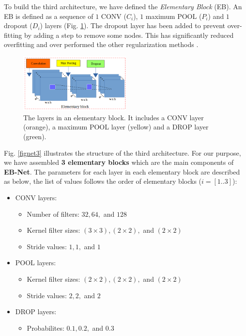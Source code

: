 \documentclass[review]{elsarticle}
\begin{document}
To build the third architecture, we have defined the
\textit{Elementary Block} (EB). An EB is defined as a sequence of $1$
CONV ($C_{i}$), $1$ maximum POOL ($P_i$) and $1$ dropout ($D_i$)
layers (Fig. \ref{figelementary}). The dropout layer has been added to
prevent over-fitting by adding a step to remove some nodes. This has
significantly reduced overfitting and over performed the other
regularization methods \cite{srivastava2014dropout}.


\begin{figure}[h]
	\centering
	\includegraphics[width=0.5\textwidth]{images/elementary_block}
	\caption{The layers in an elementary block. It includes a CONV layer (orange), a maximum POOL layer (yellow) and a DROP layer (green).}
	\label{figelementary}
\end{figure}

Fig. \ref{fignet3} illustrates the structure of the third
architecture. For our purpose, we have assembled \textbf{3 elementary
  blocks} which are the main components of \textbf{EB-Net}. The
parameters for each layer in each elementary block are described as
below, the list of values follows the order of elementary blocks ($i =
[1..3]$):

\begin{itemize}
	\item CONV layers:
	\begin{itemize}
		\item Number of filters: $32, 64, $ and $128$
		\item Kernel filter sizes: $(3 \times 3), (2 \times 2), $ and $(2 \times 2)$
		\item Stride values: $1, 1, $ and $1$ 
	\end{itemize}
	\item POOL layers:
		\begin{itemize}
			\item Kernel filter sizes: $(2 \times 2), (2 \times 2), $ and $(2 \times 2)$
			\item Stride values: $2, 2, $ and $2$
		\end{itemize}
	\item DROP layers:
		\begin{itemize}
			\item Probabilites: $0.1, 0.2, $ and $0.3$
		\end{itemize}
\end{itemize}
\end{document}
